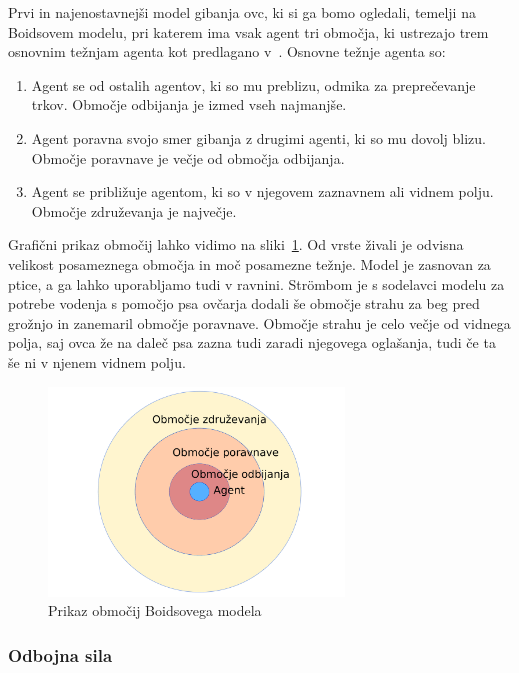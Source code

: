 Prvi in najenostavnejši model gibanja ovc, ki si ga bomo ogledali, temelji na Boidsovem modelu, pri katerem ima vsak agent tri območja, ki ustrezajo trem osnovnim težnjam agenta kot predlagano v~\cite{boids}. Osnovne težnje agenta so:
\begin{enumerate}
	\item Agent se od ostalih agentov, ki so mu preblizu, odmika za preprečevanje trkov. Območje odbijanja je izmed vseh najmanjše.
	\item Agent poravna svojo smer gibanja z drugimi agenti, ki so mu dovolj blizu. Območje poravnave je večje od območja odbijanja.
	\item Agent se približuje agentom, ki so v njegovem zaznavnem ali vidnem polju. Območje združevanja je največje.
\end{enumerate}
Grafični prikaz območij lahko vidimo na sliki~\ref{fig:boids}. Od vrste živali je odvisna velikost posameznega območja in moč posamezne težnje. Model je zasnovan za ptice, a ga lahko uporabljamo tudi v ravnini. Str{\"o}mbom je s sodelavci modelu za potrebe vodenja s pomočjo psa ovčarja dodali še območje strahu za beg pred grožnjo in zanemaril območje poravnave. Območje strahu je celo večje od vidnega polja, saj ovca že na daleč psa zazna tudi zaradi njegovega oglašanja, tudi če ta še ni v njenem vidnem polju.

\begin{figure}[ht]  %
	\centering
	\includegraphics[width=0.7\textwidth]{../poglavja/images/boids.pdf}
	\caption[Območja Boidsovega modela]{Prikaz območij Boidsovega modela} %
	\label{fig:boids}
\end{figure}

\subsubsection{Odbojna sila}

